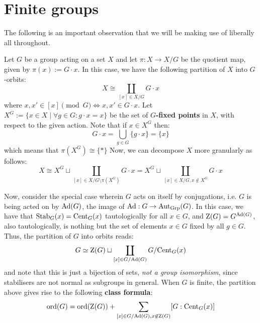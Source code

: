 \section{Finite groups}
    \begin{remark} \label{remark: class_equation}
        The following is an important observation that we will be making use of liberally all throughout. 
    
        Let $G$ be a group acting on a set $X$ and let $\pi: X \to X/G$ be the quotient map, given by $\pi(x) := G \cdot x$. In this case, we have the following partition of $X$ into $G$-orbits:
            $$X \cong \coprod_{[x] \in X/G} G \cdot x$$
        where $x, x' \in [x] \pmod{G} \iff x, x' \in G \cdot x$. Let $X^G := \{x \in X \mid \forall g \in G: g \cdot x = x\}$ be the set of \textbf{$G$-fixed points} in $X$, with respect to the given action. Note that if $x \in X^G$ then:
            $$G \cdot x = \bigcup_{g \in G} \{g \cdot x\} = \{x\}$$
        which means that $\pi(X^G) \cong \{*\}$ Now, we can decompose $X$ more granularly as follows:
            $$X \cong X^G \sqcup \coprod_{[x] \in X/G \setminus \pi(X^G)} G \cdot x = X^G \sqcup \coprod_{[x] \in X/G, x \not \in X^G} G \cdot x$$
    
        Now, consider the special case wherein $G$ acts on itself by conjugations, i.e. $G$ is being acted on by $\mathrm{Ad}(G)$, the image of $\mathrm{Ad}: G \to \mathrm{Aut}_{\mathrm{Grp}}(G)$. In this case, we have that $\mathrm{Stab}_G(x) = \mathrm{Cent}_G(x)$ tautologically for all $x \in G$, and $\mathrm{Z}(G) = G^{\mathrm{Ad}(G)}$, also tautologically, is nothing but the set of elements $x \in G$ fixed by all $g \in G$. Thus, the partition of $G$ into orbits reads:
            $$G \simeq \mathrm{Z}(G) \sqcup \coprod_{[x] \in G/\mathrm{Ad}(G)} G/\mathrm{Cent}_G(x)$$
        and note that this is just a bijection of sets, \textit{not a group isomorphism}, since stabilisers are not normal as subgroups in general. When $G$ is finite, the partition above gives rise to the following \textbf{class formula}:
            $$\operatorname{ord}(G) = \operatorname{ord}( \mathrm{Z}(G) ) + \sum_{[x] \in G/\mathrm{Ad}(G), x \not \in \mathrm{Z}(G)} [G : \mathrm{Cent}_G(x)]$$
    \end{remark}
    
